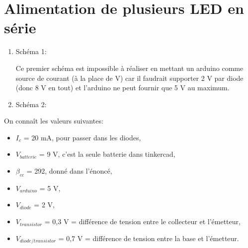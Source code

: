 \documentclass[a4paper]{article}
\begin{document}
\section{Alimentation de plusieurs LED en série}





\begin{enumerate}
    \item Schéma 1:
    \begin{center}
    \end{center}
    Ce premier schéma est impossible à réaliser en mettant un arduino comme source de courant (à la place de V) car il faudrait supporter 2 V par diode (donc 8 V en tout) et l'arduino ne peut fournir que 5 V au maximum.
    \item Schéma 2:
    \begin{center}
    \end{center}
\end{enumerate}
On connaît les valeurs suivantes:
\begin{itemize}
    \item $ I_c $ = 20 mA, pour passer dans les diodes,
    \item $ V_{batterie} $ = 9 V, c'est la seule batterie dans tinkercad,
    \item $ \beta_{cc} $ = 292, donné dans l'énoncé,
    \item $ V_{arduino} $ = 5 V,
    \item $ V_{diode} $ = 2 V,
    \item $ V_{transistor} $ = 0,3 V = différence de tension entre le collecteur et l'émetteur,
    \item $ V_{diode/transistor} $ = 0,7 V = différence de tension entre la base et l'émetteur.
\end{itemize}
\end{document}
